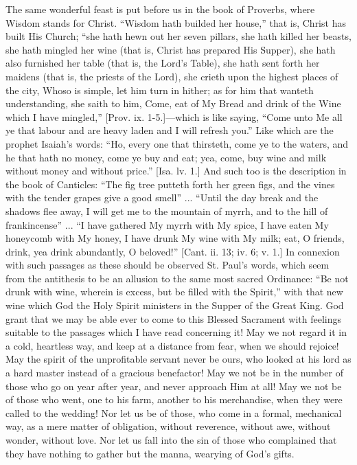 The same wonderful feast is put before us in the book of Proverbs,
where Wisdom stands for Christ. ``Wisdom hath builded her
house,'' that is, Christ has built His Church; ``she hath hewn
out her seven pillars, she hath killed her beasts, she hath mingled
her wine (that is, Christ has prepared His Supper), she hath also
furnished her table (that is, the Lord's Table), she hath sent forth
her maidens (that is, the priests of the Lord), she crieth upon the
highest places of the city, Whoso is simple, let him turn in hither;
as for him that wanteth understanding, she saith to him, Come, eat of
My Bread and drink of the Wine which I have mingled,'' [Prov. ix.
1-5.]—which is
like saying, ``Come unto Me all ye that labour and are heavy laden
and I will refresh you.'' Like which are the prophet Isaiah's
words: ``Ho, every one that thirsteth, come ye to the waters, and
he that hath no money, come ye buy and eat; yea, come, buy wine and
milk without money and without price.'' [Isa. lv. 1.] And such too
is the description in the book of Canticles: ``The fig tree
putteth forth her green figs, and the vines with the tender grapes
give a good smell'' ... ``Until the day break and the shadows
flee away, I will get me to the mountain of myrrh, and to the hill of
frankincense'' ... ``I have gathered My myrrh with My spice, I
have eaten My honeycomb with My honey, I have drunk My wine with My
milk; eat, O friends, drink, yea drink abundantly, O beloved!''
[Cant. ii. 13; iv. 6; v. 1.] In connexion with such passages as these
should be observed St. Paul's words, which seem from the antithesis to
be an allusion to the same most sacred Ordinance: ``Be not drunk
with wine, wherein is excess, but be filled with the Spirit,''
with that new wine which God the Holy Spirit ministers in the Supper
of the Great King. God grant that we may be able ever to come to this
Blessed Sacrament with feelings suitable to the passages which I have
read concerning it! May we not regard it in a cold, heartless way, and
keep at a distance from fear, when we should rejoice! May the spirit
of the unprofitable servant never be ours, who looked at his lord as a
hard master instead of a gracious benefactor! May we not be in the
number of those who go on year after year, and never approach Him at
all! May we not be of those who went, one to his farm, another to his
merchandise, when they were called to the wedding! Nor let us be of
those, who come in a formal, mechanical way, as a mere matter of
obligation, without reverence, without awe, without wonder, without
love. Nor let us fall into the sin of those who complained that they
have nothing to gather but the manna, wearying of God's gifts.

